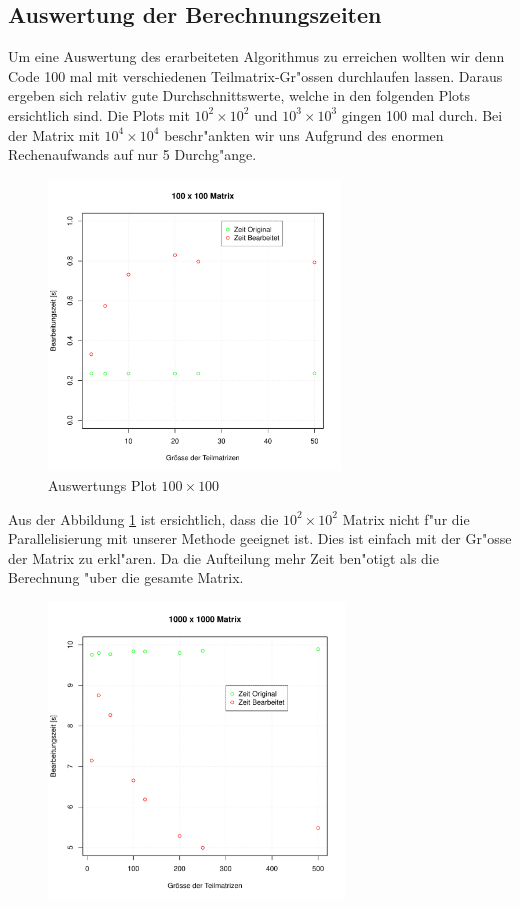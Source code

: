 \begin{refsection}
\subsection[Auswertung]{Auswertung der Berechnungszeiten}
Um eine Auswertung des erarbeiteten Algorithmus zu erreichen wollten wir denn Code 100 mal mit verschiedenen Teilmatrix-Gr"ossen durchlaufen lassen. Daraus ergeben sich relativ gute Durchschnittswerte, welche in den folgenden Plots ersichtlich sind. Die Plots mit $10^2\times10^2$ und $10^3\times10^3$ gingen 100 mal durch. Bei der Matrix mit $10^4\times10^4$ beschr"ankten wir uns Aufgrund des enormen Rechenaufwands auf nur 5 Durchg"ange.
\begin{figure}
\begin{center}
\includegraphics[width=0.69\textwidth]{./mapreduce/PC100.pdf}
\end{center}
\caption{Auswertungs Plot $100\times100$}
\label{q}
\end{figure}
Aus der Abbildung \ref{q} ist ersichtlich, dass die $10^2\times10^2$ Matrix nicht f"ur die Parallelisierung mit unserer Methode geeignet ist. Dies ist einfach mit der Gr"osse der Matrix zu erkl"aren. Da die Aufteilung mehr Zeit ben"otigt als die Berechnung "uber die gesamte Matrix.
\begin{figure}
\begin{center}
\includegraphics[width=0.7\textwidth]{./mapreduce/PC1000.pdf}

\end{center}
\end{figure}
\end{refsection}
